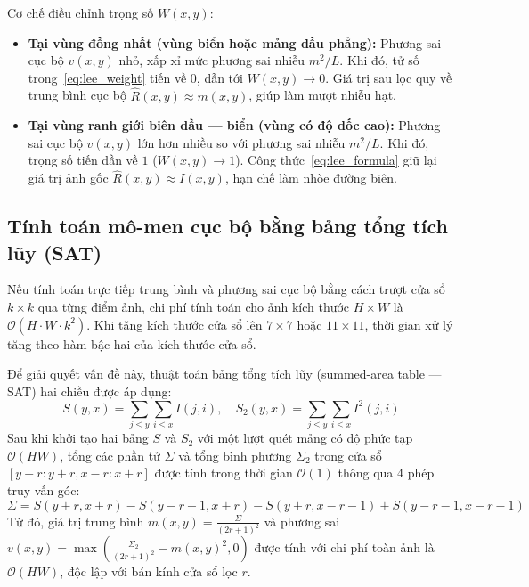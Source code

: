 Cơ chế điều chỉnh trọng số $W(x, y)$:
\begin{itemize}
    \item \textbf{Tại vùng đồng nhất (vùng biển hoặc mảng dầu phẳng):} Phương sai cục bộ $v(x, y)$ nhỏ, xấp xỉ mức phương sai nhiễu $m^2/L$. Khi đó, tử số trong~\eqref{eq:lee_weight} tiến về 0, dẫn tới $W(x, y) \to 0$. Giá trị sau lọc quy về trung bình cục bộ $\hat{R}(x, y) \approx m(x, y)$, giúp làm mượt nhiễu hạt.
    \item \textbf{Tại vùng ranh giới biên dầu --- biển (vùng có độ dốc cao):} Phương sai cục bộ $v(x, y)$ lớn hơn nhiều so với phương sai nhiễu $m^2/L$. Khi đó, trọng số tiến dần về $1$ ($W(x, y) \to 1$). Công thức~\eqref{eq:lee_formula} giữ lại giá trị ảnh gốc $\hat{R}(x, y) \approx I(x, y)$, hạn chế làm nhòe đường biên.
\end{itemize}

\subsection{Tính toán mô-men cục bộ bằng bảng tổng tích lũy (SAT)}

Nếu tính toán trực tiếp trung bình và phương sai cục bộ bằng cách trượt cửa sổ $k \times k$ qua từng điểm ảnh, chi phí tính toán cho ảnh kích thước $H \times W$ là $\mathcal{O}(H \cdot W \cdot k^2)$. Khi tăng kích thước cửa sổ lên $7 \times 7$ hoặc $11 \times 11$, thời gian xử lý tăng theo hàm bậc hai của kích thước cửa sổ.

Để giải quyết vấn đề này, thuật toán bảng tổng tích lũy (summed-area table --- SAT) hai chiều được áp dụng:
\begin{equation}
S(y, x) = \sum_{j \le y} \sum_{i \le x} I(j, i), \quad S_2(y, x) = \sum_{j \le y} \sum_{i \le x} I^2(j, i)
\label{eq:sat_definition}
\end{equation}
Sau khi khởi tạo hai bảng $S$ và $S_2$ với một lượt quét mảng có độ phức tạp $\mathcal{O}(HW)$, tổng các phần tử $\Sigma$ và tổng bình phương $\Sigma_2$ trong cửa sổ $[y-r : y+r, x-r : x+r]$ được tính trong thời gian $\mathcal{O}(1)$ thông qua 4 phép truy vấn góc:
\begin{equation}
\Sigma = S(y+r, x+r) - S(y-r-1, x+r) - S(y+r, x-r-1) + S(y-r-1, x-r-1)
\label{eq:sat_query}
\end{equation}
Từ đó, giá trị trung bình $m(x, y) = \frac{\Sigma}{(2r+1)^2}$ và phương sai $v(x, y) = \max\left(\frac{\Sigma_2}{(2r+1)^2} - m(x, y)^2, 0\right)$ được tính với chi phí toàn ảnh là $\mathcal{O}(HW)$, độc lập với bán kính cửa sổ lọc $r$.
